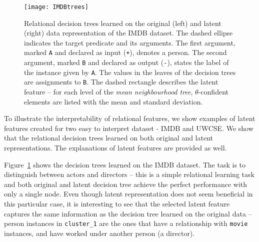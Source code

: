 


\begin{figure}[t]
	\centering
	\medskip
    \texttt{[image: IMDBtrees]}
    \caption[Explanation of the latent features invented on the IMDB dataset]{Relational decision trees learned on the original (left) and latent (right) data representation of the IMDB dataset. The dashed ellipse indicates the target predicate and its arguments. The first argument, marked \texttt{A} and declared as input (\texttt{+}), denotes a person. The second argument, marked \texttt{B} and declared as output (\texttt{-}), states the label of the instance given by \texttt{A}. The values in the leaves of the decision trees are assignments to \texttt{B}. The dashed rectangle describes the latent feature -- for each level of the \textit{mean neighbourhood tree}, $\theta$-confident elements are listed with the mean and standard deviation.  }
    \label{fig:IMDBtree}
\end{figure}



To illustrate the interpretability of relational features, we show examples of latent features created for two easy to interpret dataset - IMDB and UWCSE.
We show that the relational decision trees  learned on both original and latent representations.
The explanations of latent features are provided as well.



Figure~\ref{fig:IMDBtree} shows the decision trees learned on the IMDB dataset.
The task is to distinguish between actors and directors -- this is a simple relational learning task and both original and latent decision tree achieve the perfect performance with only a single node.
Even though latent representation does not seem beneficial in this particular case, it is interesting to see that the selected latent feature captures the same information as the decision tree learned on the original data -- person instances in \texttt{cluster\_1} are the ones that have a relationship with \texttt{movie} instances, and have worked under another person (a director).



